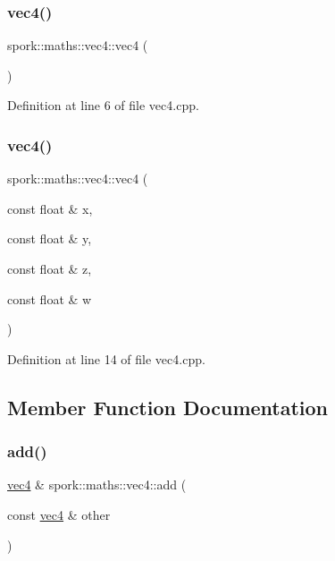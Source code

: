 \subsubsection{\texorpdfstring{vec4()}{vec4()}\hspace{0.1cm}{\footnotesize\ttfamily [1/2]}}
{\footnotesize\ttfamily spork\+::maths\+::vec4\+::vec4 (\begin{DoxyParamCaption}{ }\end{DoxyParamCaption})}



Definition at line 6 of file vec4.\+cpp.

\mbox{\label{structspork_1_1maths_1_1vec4_a22a9b30141b4b7b968823a0fb12e4e3e}} 
\subsubsection{\texorpdfstring{vec4()}{vec4()}\hspace{0.1cm}{\footnotesize\ttfamily [2/2]}}
{\footnotesize\ttfamily spork\+::maths\+::vec4\+::vec4 (\begin{DoxyParamCaption}\item[{const float \&}]{x,  }\item[{const float \&}]{y,  }\item[{const float \&}]{z,  }\item[{const float \&}]{w }\end{DoxyParamCaption})}



Definition at line 14 of file vec4.\+cpp.



\subsection{Member Function Documentation}
\mbox{\label{structspork_1_1maths_1_1vec4_aa4eae30a8882321a03723525d734bcb1}} 
\subsubsection{\texorpdfstring{add()}{add()}}
{\footnotesize\ttfamily \hyperlink{structspork_1_1maths_1_1vec4}{vec4} \& spork\+::maths\+::vec4\+::add (\begin{DoxyParamCaption}\item[{const \hyperlink{structspork_1_1maths_1_1vec4}{vec4} \&}]{other }\end{DoxyParamCaption})}



